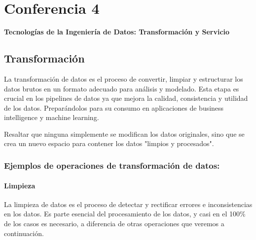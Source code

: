 \documentclass[12pt]{book}
\begin{document}
\chapter{Conferencia 4}
\normalfont\LARGE \textbf{Tecnologías de la Ingeniería de Datos: Transformación y Servicio}
\normalfont\small\\

\section{Transformación}
La transformación de datos es el proceso de convertir, limpiar y estructurar los datos 
brutos en un formato adecuado para análisis y modelado. Esta etapa es crucial en los 
pipelines de datos ya que mejora la calidad, consistencia y utilidad de los datos. Preparándolos 
para su consumo en aplicaciones de business intelligence y machine learning.

Resaltar que ninguna simplemente se modifican los datos originales, sino que se crea un nuevo espacio para contener los datos "limpios y procesados".

\subsection{Ejemplos de operaciones de transformación de datos:}

\subsubsection{Limpieza}
La limpieza de datos es el proceso de detectar y rectificar errores e inconsistencias en 
los datos. Es parte esencial del procesamiento de los datos, y casi en el 100\% de los casos 
es necesario, a diferencia de otras operaciones que veremos a continuación. 
\end{document}
